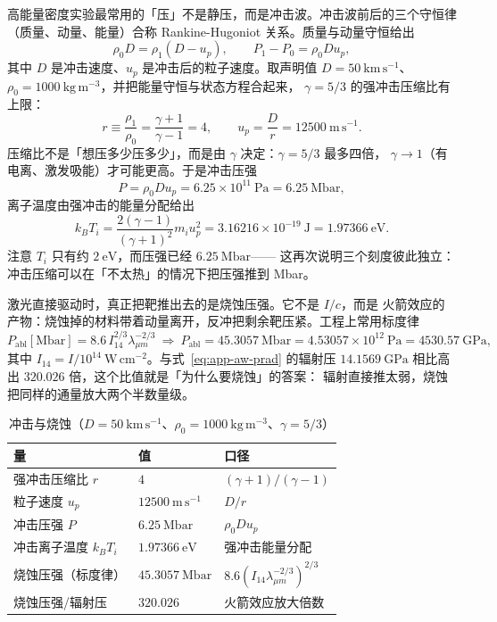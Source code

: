 高能量密度实验最常用的「压」不是静压，而是冲击波。冲击波前后的三个守恒律
（质量、动量、能量）合称 Rankine-Hugoniot 关系。质量与动量守恒给出
\begin{equation}
\rho_0D=\rho_1(D-u_p),\qquad
P_1-P_0=\rho_0Du_p,
\label{eq:app-aw-rh1}
\end{equation}
其中 $D$ 是冲击速度、$u_p$ 是冲击后的粒子速度。取声明值 $D=50\ \mathrm{km\,s^{-1}}$、
$\rho_0=1000\ \mathrm{kg\,m^{-3}}$，并把能量守恒与状态方程合起来，
$\gamma=5/3$ 的强冲击压缩比有上限：
\begin{equation}
r\equiv\frac{\rho_1}{\rho_0}=\frac{\gamma+1}{\gamma-1}=4,
\qquad
u_p=\frac{D}{r}=12500\ \mathrm{m\,s^{-1}}.
\label{eq:app-aw-rh2}
\end{equation}
压缩比不是「想压多少压多少」，而是由 $\gamma$ 决定：$\gamma=5/3$ 最多四倍，
$\gamma\to1$（有电离、激发吸能）才可能更高。于是冲击压强
\begin{equation}
P=\rho_0Du_p=6.25\times10^{11}\ \mathrm{Pa}=6.25\ \mathrm{Mbar},
\label{eq:app-aw-rh3}
\end{equation}
离子温度由强冲击的能量分配给出
\begin{equation}
k_BT_i=\frac{2(\gamma-1)}{(\gamma+1)^2}m_iu_p^2=3.16216\times10^{-19}\ \mathrm{J}
=1.97366\ \mathrm{eV}.
\label{eq:app-aw-shockt}
\end{equation}
注意 $T_i$ 只有约 $2\ \mathrm{eV}$，而压强已经 $6.25\ \mathrm{Mbar}$——
这再次说明三个刻度彼此独立：冲击压缩可以在「不太热」的情况下把压强推到 Mbar。

激光直接驱动时，真正把靶推出去的是烧蚀压强。它不是 $I/c$，而是
火箭效应的产物：烧蚀掉的材料带着动量离开，反冲把剩余靶压紧。工程上常用标度律
\begin{equation}
P_\mathrm{abl}[\mathrm{Mbar}]
=8.6\,I_{14}^{2/3}\lambda_{\mu m}^{-2/3}
\ \Rightarrow\
P_\mathrm{abl}=45.3057\ \mathrm{Mbar}
=4.53057\times10^{12}\ \mathrm{Pa}=4530.57\ \mathrm{GPa},
\label{eq:app-aw-abl}
\end{equation}
其中 $I_{14}=I/10^{14}\ \mathrm{W\,cm^{-2}}$。与式~\eqref{eq:app-aw-prad} 的辐射压
$14.1569\ \mathrm{GPa}$ 相比高出 $320.026$ 倍，这个比值就是「为什么要烧蚀」的答案：
辐射直接推太弱，烧蚀把同样的通量放大两个半数量级。

\begin{table}[htbp]
\centering
\small
\caption{冲击与烧蚀（$D=50\ \mathrm{km\,s^{-1}}$、$\rho_0=1000\ \mathrm{kg\,m^{-3}}$、$\gamma=5/3$）}
\label{tab:app-aw-shock}
\begin{tabular}{p{4.4cm}p{4.2cm}p{4.2cm}}
\hline
量 & 值 & 口径 \\
\hline
强冲击压缩比 $r$ & $4$ & $(\gamma+1)/(\gamma-1)$ \\
粒子速度 $u_p$ & $12500\ \mathrm{m\,s^{-1}}$ & $D/r$ \\
冲击压强 $P$ & $6.25\ \mathrm{Mbar}$ & $\rho_0Du_p$ \\
冲击离子温度 $k_BT_i$ & $1.97366\ \mathrm{eV}$ & 强冲击能量分配 \\
烧蚀压强（标度律） & $45.3057\ \mathrm{Mbar}$ & $8.6(I_{14}\lambda_{\mu m}^{-2/3})^{2/3}$ \\
烧蚀压强/辐射压 & $320.026$ & 火箭效应放大倍数 \\
\hline
\end{tabular}
\end{table}


